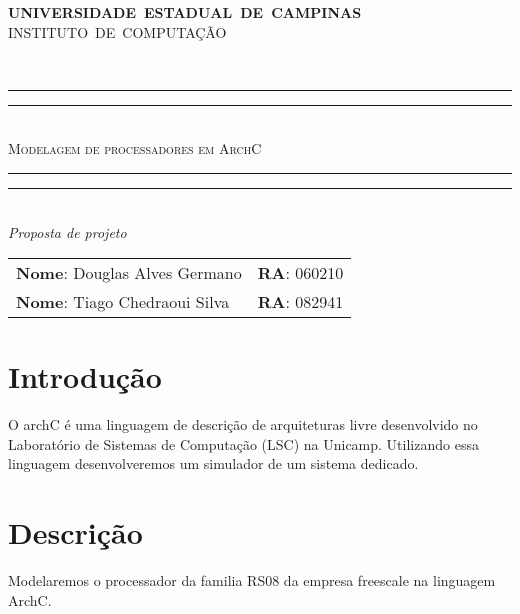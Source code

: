 \documentclass[10pt,a4paper]{article}
\begin{document}
  \thispagestyle{empty}
  
  \begin{minipage}[h]{0.10\linewidth}
  \end{minipage}
  \begin{minipage}[h!]{0.7\linewidth}
    \vspace*{\fill}
    \centering
    {\large \textbf{UNIVERSIDADE~ESTADUAL~DE~CAMPINAS}}\\ 
    {\large INSTITUTO~DE~COMPUTAÇÃO}                   
    \vspace*{\fill} 
  \end{minipage}
    \\\vspace{0.5cm}
  
  \begin{center} 
    \rule{11.0cm}{0.4pt}\vspace*{-\baselineskip}\vspace{-2.0pt}
    \rule{11.0cm}{1.6pt} \vspace*{2.0pt}\\
      {\Large \textsc{Modelagem de processadores em ArchC}}\vspace{-3.2pt}
    \rule{11.0cm}{0.4pt}\vspace*{-\baselineskip}\vspace{3.2pt} \rule{11.0cm}{1.6pt}\\
    {\textsl{Proposta de projeto}}
    \\\vspace{1cm}
    \begin{tabular}{ll}
      \textbf{Nome}: Douglas Alves Germano        &   \textbf{RA}: 060210\\
      \textbf{Nome}: Tiago Chedraoui Silva        &       \textbf{RA}: 082941
      
    \end{tabular}
  \end{center}
  \vspace{0.5cm}
  
  \section*{Introdução}
  
  O archC é uma linguagem de descrição de arquiteturas livre
  desenvolvido no Laboratório de Sistemas de Computação (LSC) na
  Unicamp. Utilizando essa linguagem desenvolveremos um simulador de um sistema dedicado. 
  
  \section*{Descrição}
  Modelaremos o processador da familia RS08 da empresa freescale na
  linguagem ArchC. 
  
\end{document}
